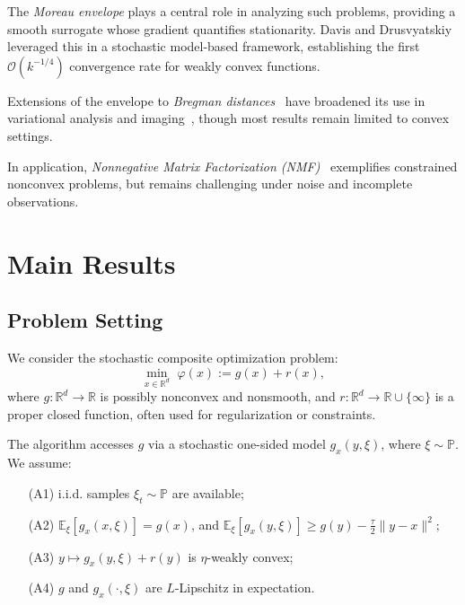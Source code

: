 \documentclass{article}
\begin{document}
The \textit{Moreau envelope} plays a central role in analyzing such problems, providing a smooth surrogate whose gradient quantifies stationarity. Davis and Drusvyatskiy leveraged this in a stochastic model-based framework, establishing the first $\mathcal{O}(k^{-1/4})$ convergence rate for weakly convex functions.

Extensions of the envelope to \textit{Bregman distances}~\parencite{kan2012bregman, heinze2022bregman} have broadened its use in variational analysis and imaging~\parencite{durmus2018efficient}, though most results remain limited to convex settings.

In application, \textit{Nonnegative Matrix Factorization (NMF)}~\parencite{gillis2017introduction} exemplifies constrained nonconvex problems, but remains challenging under noise and incomplete observations.


\section{Main Results}

\subsection{Problem Setting}

We consider the stochastic composite optimization problem:
\begin{equation}
\min_{x \in \mathbb{R}^d} \,\, \varphi(x) := g(x) + r(x),
\label{eq:main}
\end{equation}
where \( g: \mathbb{R}^d \to \mathbb{R} \) is possibly nonconvex and nonsmooth, and \( r: \mathbb{R}^d \to \mathbb{R} \cup \{\infty\} \) is a proper closed function, often used for regularization or constraints.

The algorithm accesses \( g \) via a stochastic one-sided model \( g_x(y, \xi) \), where \( \xi \sim \mathbb{P} \). We assume:

\begin{itemize}
    \item[(A1)] i.i.d. samples \( \xi_t \sim \mathbb{P} \) are available;
    \item[(A2)] \( \mathbb{E}_\xi[g_x(x, \xi)] = g(x) \), and 
  \( 
    \mathbb{E}_\xi[g_x(y, \xi)] \ge g(y) - \frac{\tau}{2} \|y - x\|^2;
    \)
    \item[(A3)] \( y \mapsto g_x(y, \xi) + r(y) \) is \( \eta \)-weakly convex;
    \item[(A4)] \( g \) and \( g_x(\cdot, \xi) \) are \( L \)-Lipschitz in expectation.
\end{itemize}
\end{document}

